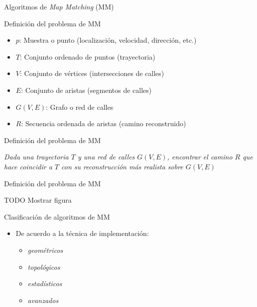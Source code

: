 \begin{frame}[c]
	\begin{center}
		\huge{Algoritmos de \emph{Map Matching} (MM)}
    \end{center}
\end{frame}

\begin{frame}[c]{Definición del problema de MM}
	\large
	\begin{itemize}	 	
		\item $p$: Muestra o punto (localización, velocidad, dirección, etc.)
		\item $T$: Conjunto ordenado de puntos (trayectoria)
		\item $V$: Conjunto de vértices (intersecciones de calles)
		\item $E$: Conjunto de aristas (segmentos de calles)
		\item $G(V,E)$: Grafo o red de calles
		\item $R$: Secuencia ordenada de aristas (camino reconstruido)
	\end{itemize}			
\end{frame}

\begin{frame}[c]{Definición del problema de MM}
	\Large
	\begin{center}
		\emph{Dada una trayectoria $T$ y una red de calles $G(V,E)$, encontrar el camino $R$ que hace coincidir a $T$ con su reconstrucción más realista sobre $G(V,E)$}		
	\end{center}
\end{frame}

\begin{frame}[c]{Definición del problema de MM}
	\Large
	\begin{center}
		TODO Mostrar figura
	\end{center}
\end{frame}

\begin{frame}[c]{Clasificación de algoritmos de MM}
	\Large
	\begin{itemize}	 	
		\item De acuerdo a la técnica de implementación:
		\begin{itemize}
			\large
			\item \emph{geométricos}
			\item \emph{topológicos}
			\item \emph{estadísticos}
			\item \emph{avanzados}
		\end{itemize}
	\end{itemize}
\end{frame}

